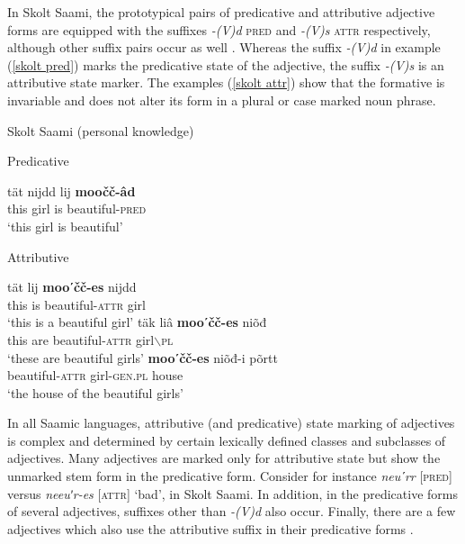 In Skolt Saami, the prototypical pairs of predicative and attributive adjective forms are equipped with the suffixes \textit{-(V)d} \textsc{pred} and \textit{-(V)s} \textsc{attr} respectively, although other suffix pairs occur as well \citep[173–176]{feist2015a}. Whereas the suffix \textit{-(V)d} in example (\ref{skolt pred}) marks the predicative state of the adjective, the suffix \mbox{\textit{-(V)s}} is an attributive state marker. The examples (\ref{skolt attr}) show that the formative is invariable and does not alter its form in a plural or case marked noun phrase.
\begin{exe}
\ex \rm{Skolt Saami (personal knowledge)}
\begin{xlist}
\ex \label{skolt pred}
\rm{Predicative}
\begin{xlist}
\gll	tät nijdd lij \textbf{moočč-âd}\\
	this girl is beautiful-\textsc{pred}\\
\glt	‘this girl is beautiful’
\end{xlist}
\ex \label{skolt attr}
\rm{Attributive} 
\begin{xlist}
\ex
\gll 	tät lij \textbf{mooʹčč-es} nijdd\\
	this is beautiful-\textsc{attr} girl\\
\glt	‘this is a beautiful girl’
\ex	
\gll	täk liâ \textbf{mooʹčč-es} niõđ\\
	this are beautiful-\textsc{attr} girl$\backslash$\textsc{pl}\\
\glt	‘these are beautiful girls’
\ex	
\gll	\textbf{mooʹčč-es} niõđ-i põrtt\\
	beautiful-\textsc{attr} girl-\textsc{gen.pl} house\\
\glt	‘the house of the beautiful girls’
\end{xlist}
\end{xlist}
\end{exe}
In all Saamic languages, attributive (and predicative) state marking of adjectives is complex and determined by certain lexically defined classes and subclasses of adjectives. Many adjectives are marked only for attributive state but show the unmarked stem form in the predicative form. Consider for instance \textit{neuʹrr} [\textsc{pred}] versus \textit{neeuʹr-es} [\textsc{attr}] ‘bad’, in Skolt Saami. In addition, in the predicative forms of several adjectives, suffixes other than \textit{-(V)d} also occur. Finally, there are a few adjectives which also use the attributive suffix in their predicative forms \citep[cf.][173–176]{feist2015a}.

